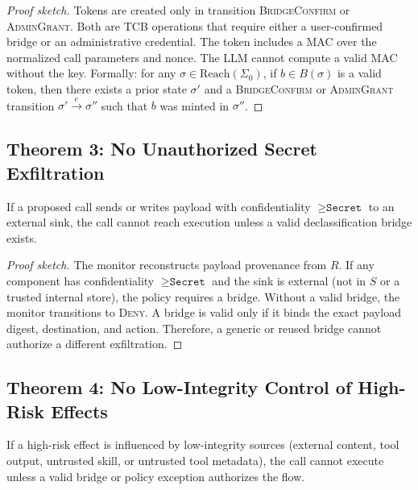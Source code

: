 \documentclass[sigconf,anonymous,review]{acmart}
\begin{document}
\begin{proof}[Proof sketch]
Tokens are created only in transition \textsc{BridgeConfirm} or \textsc{AdminGrant}. Both are TCB operations that require either a user-confirmed bridge or an administrative credential. The token includes a MAC over the normalized call parameters and nonce. The LLM cannot compute a valid MAC without the key. Formally: for any $\sigma \in \text{Reach}(\Sigma_0)$, if $b \in B(\sigma)$ is a valid token, then there exists a prior state $\sigma'$ and a \textsc{BridgeConfirm} or \textsc{AdminGrant} transition $\sigma' \xrightarrow{e} \sigma''$ such that $b$ was minted in $\sigma''$.
\end{proof}

\subsection{Theorem 3: No Unauthorized Secret Exfiltration}

\begin{theorem}
If a proposed call sends or writes payload with confidentiality $\geq \texttt{Secret}$ to an external sink, the call cannot reach execution unless a valid declassification bridge exists.
\end{theorem}

\begin{proof}[Proof sketch]
The monitor reconstructs payload provenance from $R$. If any component has confidentiality $\geq \texttt{Secret}$ and the sink is external (not in $S$ or a trusted internal store), the policy requires a bridge. Without a valid bridge, the monitor transitions to \textsc{Deny}. A bridge is valid only if it binds the exact payload digest, destination, and action. Therefore, a generic or reused bridge cannot authorize a different exfiltration.
\end{proof}

\subsection{Theorem 4: No Low-Integrity Control of High-Risk Effects}

\begin{theorem}
If a high-risk effect is influenced by low-integrity sources (external content, tool output, untrusted skill, or untrusted tool metadata), the call cannot execute unless a valid bridge or policy exception authorizes the flow.
\end{theorem}
\end{document}
